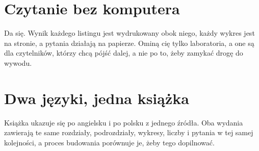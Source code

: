 \section*{Czytanie bez komputera}

Da się. Wynik każdego listingu jest wydrukowany obok niego, każdy wykres
jest na stronie, a pytania działają na papierze. Ominą cię tylko
laboratoria, a one są dla czytelników, którzy chcą pójść dalej, a nie po to,
żeby zamykać drogę do wywodu.

\section*{Dwa języki, jedna książka}

Książka ukazuje się po angielsku i po polsku z jednego źródła. Oba wydania
zawierają te same rozdziały, podrozdziały, wykresy, liczby i pytania w tej
samej kolejności, a proces budowania porównuje je, żeby tego dopilnować.
